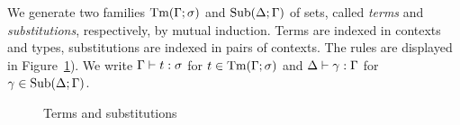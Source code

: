 \begin{defn}
We generate two families $\mathrm{Tm}(\Gamma; \sigma)$ and $\mathrm{Sub}(\Delta; \Gamma)$ of sets, called \emph{terms} and \emph{substitutions}, respectively, by mutual induction. Terms are indexed in contexts and types, substitutions are indexed in pairs of contexts. The rules are displayed in Figure~\ref{fig:stlc2-terms-subs}). We write $\Gamma \vdash t : \sigma$ for $t \in \mathrm{Tm}(\Gamma; \sigma)$ and $\Delta \vdash \gamma : \Gamma$ for $\gamma \in \mathrm{Sub}(\Delta; \Gamma)$.

\begin{figure}[ht]
\caption{Terms and substitutions}
\label{fig:stlc2-terms-subs}
\end{figure}
\end{defn}

\begin{comment}
\begin{items}
\item variable names vs de Bruijn indices, explicit substitution
\item operations on substitutions
\end{items}

\begin{items}
\item Context is a list of types representing for each position their type.
\item A variable is a position in this context.
\end{items}
\end{comment}

